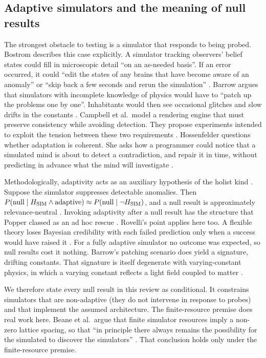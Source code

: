 \subsection{Adaptive simulators and the meaning of null results}
\label{sec:methodology:adaptive}

The strongest obstacle to testing is a simulator that responds to being
probed. Bostrom describes this case explicitly. A simulator tracking
observers' belief states could fill in microscopic detail ``on an as-needed
basis''. If an error occurred, it could ``edit the states of any brains that
have become aware of an anomaly'' or ``skip back a few seconds and rerun the
simulation'' \cite{Bostrom2003are}. Barrow argues that simulators with
incomplete knowledge of physics would have to ``patch up the problems one by
one''. Inhabitants would then see occasional glitches and slow drifts in the
constants \cite{Barrow2007living}. Campbell et al.\ model a rendering engine
that must preserve consistency while avoiding detection. They propose
experiments intended to exploit the tension between these two requirements
\cite{Campbell2017on}. Hossenfelder questions whether adaptation is coherent.
She asks how a programmer could notice that a simulated mind is about to
detect a contradiction, and repair it in time, without predicting in advance
what the mind will investigate \cite{Hossenfelder2017no}.

Methodologically, adaptivity acts as an auxiliary hypothesis of the holist
kind \cite{Stanford2023underdetermination}. Suppose the simulator suppresses
detectable anomalies. Then $P(\text{null}\mid H_{\rm SIM}\wedge\text{adaptive})
\approx P(\text{null}\mid\neg H_{\rm SIM})$, and a null result is
approximately relevance-neutral \cite{Crupi2025confirmation}. Invoking adaptivity after a
null result has the structure that Popper classed as an ad hoc rescue
\cite{Thornton2026karl}. Rovelli's point applies here too. A flexible theory
loses Bayesian credibility with each failed prediction only when a success
would have raised it \cite{Rovelli2019dangers}. For a fully adaptive simulator
no outcome was expected, so null results cost it nothing. Barrow's patching
scenario does yield a signature, drifting constants. That signature is itself
degenerate with varying-constant physics, in which a varying constant reflects
a light field coupled to matter \cite{Uzan2011varying}.

We therefore state every null result in this review as conditional. It
constrains simulators that are non-adaptive (they do not intervene in response
to probes) and that implement the assumed architecture. The finite-resource
premise does real work here. Beane et al.\ argue that finite simulator
resources imply a non-zero lattice spacing, so that ``in principle there
always remains the possibility for the simulated to discover the simulators''
\cite{Beane2014constraints}. That conclusion holds only under the finite-resource
premise.

